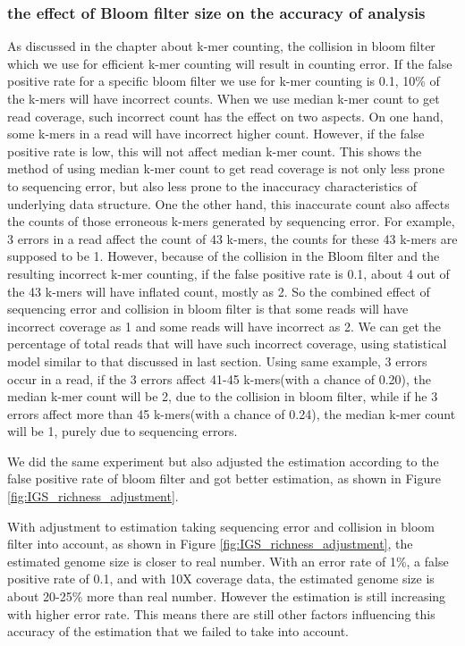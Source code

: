 \subsubsection{the effect of Bloom filter size on the accuracy of analysis}
As discussed in the chapter about k-mer counting, the collision in bloom filter
which we use for efficient k-mer counting will result in counting error. If the
false positive rate for a specific bloom filter we use for k-mer counting is
0.1, 10\% of the k-mers will have incorrect counts. When we use median k-mer
count to get read coverage, such incorrect count has the effect on two aspects.
On one hand, some k-mers in a read will have incorrect higher count. However, if the
 false
positive rate is low, this will not affect median k-mer count. This shows the
method of using median k-mer count to get read coverage is not only less prone
to sequencing error, but also less prone to the inaccuracy characteristics of
underlying data structure. One the other hand, this inaccurate count also
affects the counts of those erroneous k-mers generated by sequencing error. For
example, 3 errors in a read affect the count of 43 k-mers, the counts for these
43 k-mers are supposed to be 1. However, because of the collision in the Bloom filter
and the resulting incorrect k-mer counting, if the false positive rate is 0.1,
about 4 out of the 43 k-mers will have inflated count, mostly as 2. So the
combined effect of sequencing error and collision in bloom filter is that some
reads will have incorrect coverage as 1 and some reads will have incorrect as
2. We can get the percentage of total reads that will have such incorrect
coverage, using statistical model similar to that discussed in last section.
Using same example, 3 errors occur in a read, if the 3 errors affect 41-45
k-mers(with a chance of 0.20), the median k-mer count will be 2, due to the 
collision in bloom filter, while if he 3 errors affect more than 45 k-mers(with 
a chance of 0.24), the median k-mer count will be 1, purely due to sequencing 
errors. 

We did the same experiment but also adjusted the estimation according to the 
false positive rate of bloom filter and got better estimation, as shown in
Figure \ref{fig:IGS_richness_adjustment}.

With adjustment to estimation taking sequencing error and collision in bloom
filter into account, as shown in Figure \ref{fig:IGS_richness_adjustment}, the 
estimated genome size is closer to real number. With an error rate of 1\%,
a false positive rate of 0.1, and with 10X coverage data, the estimated genome size
is about 20-25\% more than real number. However the estimation is still 
increasing with higher
error rate. This means there are still other factors influencing this
accuracy of the estimation that we failed to take into account.



